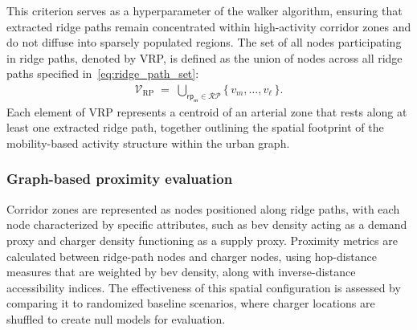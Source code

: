 % 
This criterion serves as a hyperparameter of the walker algorithm, ensuring that extracted ridge paths remain concentrated within high-activity corridor zones and do not diffuse into sparsely populated regions.
The set of all nodes participating in ridge paths, denoted by \gls{VRP}, is defined as the union of nodes across all ridge paths specified in~\eqref{eq:ridge_path_set}:
\begin{align}
\label{eq:ridge_path_nodes}
\mathcal{V}_{\mathrm{RP}}
\;=\;
\bigcup_{\mathsf{rp_m}\in\mathcal{RP}}
\{\, v_m, \dots, v_\ell \,\}.
\end{align}
Each element of \gls{VRP} represents a centroid of an arterial zone that rests along at least one extracted ridge path, together outlining the spatial footprint of the mobility-based activity structure within the urban graph.


\subsubsection{Graph-based proximity evaluation}
Corridor zones are represented as nodes positioned along ridge paths, with each node characterized by specific attributes, such as \gls{bev} density acting as a demand proxy and charger density functioning as a supply proxy. Proximity metrics are calculated between ridge-path nodes and charger nodes, using hop-distance measures that are weighted by \gls{bev} density, along with inverse-distance accessibility indices. The effectiveness of this spatial configuration is assessed by comparing it to randomized baseline scenarios, where charger locations are shuffled to create null models for evaluation.

